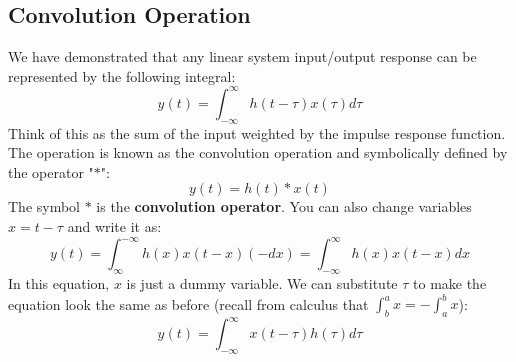 \subsection{Convolution Operation}
We have demonstrated that any linear system input/output response can be represented by the following integral:
    \begin{equation}
        y(t) = \int_{-\infty}^{\infty} h(t-\tau) x(\tau) d\tau 
    \end{equation}
Think of this as the sum of the input weighted by the impulse response function.  The operation is known as the convolution operation and symbolically defined by the operator "$*$":  
    \begin{equation}
        y(t) = h(t) * x(t)
    \end{equation}
The symbol $*$ is the \textbf{convolution operator}. You can also change variables $x = t - \tau$ and write it as:
    \begin{equation}
        y(t) = \int_{\infty}^{-\infty} h(x) x(t-x) (-dx) = \int_{-\infty}^{\infty} h(x) x(t-x) dx 
    \end{equation}
In this equation, $x$ is just a dummy variable.  We can substitute $\tau$ to make the equation look the same as before (recall from calculus that  $\int_b^a x = -\int_a^b x$):
    \begin{equation}
        y(t) =  \int_{-\infty}^{\infty} x(t-\tau) h(\tau) d\tau
    \end{equation}
